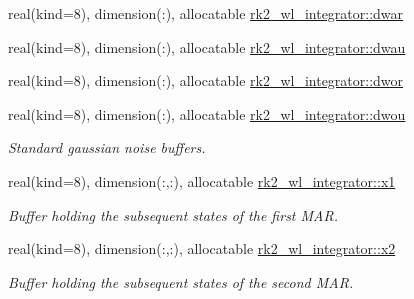 \begin{DoxyCompactItemize}
real(kind=8), dimension(\+:), allocatable \hyperlink{namespacerk2__wl__integrator_a44cee4402f05ef3465bf87baf91951e8}{rk2\+\_\+wl\+\_\+integrator\+::dwar}
\item 
real(kind=8), dimension(\+:), allocatable \hyperlink{namespacerk2__wl__integrator_afa336c0cb10e6befa1ccc44522e2f517}{rk2\+\_\+wl\+\_\+integrator\+::dwau}
\item 
real(kind=8), dimension(\+:), allocatable \hyperlink{namespacerk2__wl__integrator_a94b90cb88115b2d39977de8b89909833}{rk2\+\_\+wl\+\_\+integrator\+::dwor}
\item 
real(kind=8), dimension(\+:), allocatable \hyperlink{namespacerk2__wl__integrator_a1e05e6efc7acdce81954944c134ac83b}{rk2\+\_\+wl\+\_\+integrator\+::dwou}
\begin{DoxyCompactList}\small\item\em Standard gaussian noise buffers. \end{DoxyCompactList}\item 
real(kind=8), dimension(\+:,\+:), allocatable \hyperlink{namespacerk2__wl__integrator_a5fd86898081b24e076b0830a5d1e9e51}{rk2\+\_\+wl\+\_\+integrator\+::x1}
\begin{DoxyCompactList}\small\item\em Buffer holding the subsequent states of the first M\+AR. \end{DoxyCompactList}\item 
real(kind=8), dimension(\+:,\+:), allocatable \hyperlink{namespacerk2__wl__integrator_a7fad5dbd04a9b5dc47bdb9b8c33e44e0}{rk2\+\_\+wl\+\_\+integrator\+::x2}
\begin{DoxyCompactList}\small\item\em Buffer holding the subsequent states of the second M\+AR. \end{DoxyCompactList}\end{DoxyCompactItemize}

